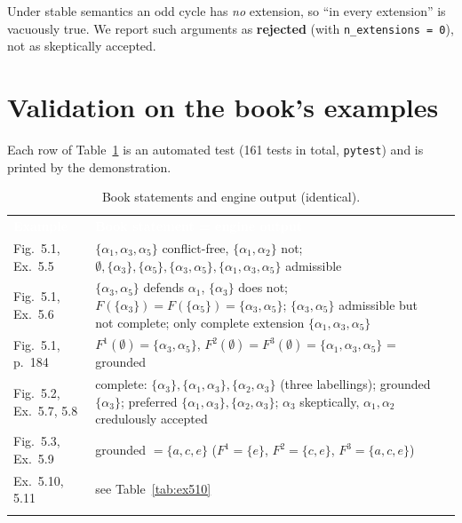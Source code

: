 \documentclass[10pt,a4paper]{article}
\newcommand{\thd}[1]{\textcolor{white}{\sffamily\bfseries #1}}
\newcommand{\yes}{\textcolor{good}{\ding{51}}}
\newcommand{\code}[1]{\textcolor{brand!85!black}{\texttt{#1}}}
\newcommand{\tabend}{\arrayrulecolor{brand}\specialrule{0.8pt}{0pt}{0pt}\arrayrulecolor{black}}
\newcommand{\al}[1]{\alpha_{#1}}
\begin{document}
\begin{notebox}
Under stable semantics an odd cycle has \emph{no} extension, so ``in every extension'' is vacuously true. We report such
arguments as \textbf{rejected} (with \code{n\_extensions = 0}), not as skeptically accepted.
\end{notebox}

\section{Validation on the book's examples}\label{sec:validation}

Each row of Table~\ref{tab:book} is an automated test (161 tests in total, \code{pytest}) and is printed by the demonstration.

\begin{table}[H]\centering
\caption{Book statements and engine output (identical).}\label{tab:book}
\small
\begin{tabularx}{\textwidth}{>{\raggedright\arraybackslash}p{2.4cm} X c}
\rowcolor{brand}\thd{Example} & \thd{Book statement = engine output} & \thd{}\\
\rowcolor{white} Fig.~5.1, Ex.~5.5 & $\{\al1,\al3,\al5\}$ conflict-free, $\{\al1,\al2\}$ not; $\emptyset,\{\al3\},\{\al5\},\{\al3,\al5\},\{\al1,\al3,\al5\}$ admissible & \yes\\
\rowcolor{rowalt} Fig.~5.1, Ex.~5.6 & $\{\al3,\al5\}$ defends $\al1$, $\{\al3\}$ does not; $F(\{\al3\})=F(\{\al5\})=\{\al3,\al5\}$; $\{\al3,\al5\}$ admissible but not complete; only complete extension $\{\al1,\al3,\al5\}$ & \yes\\
\rowcolor{white} Fig.~5.1, p.~184 & $F^1(\emptyset)=\{\al3,\al5\}$, $F^2(\emptyset)=F^3(\emptyset)=\{\al1,\al3,\al5\}$ = grounded & \yes\\
\rowcolor{rowalt} Fig.~5.2, Ex.~5.7, 5.8 & complete: $\{\al3\},\{\al1,\al3\},\{\al2,\al3\}$ (three labellings); grounded $\{\al3\}$; preferred $\{\al1,\al3\},\{\al2,\al3\}$; $\al3$ skeptically, $\al1,\al2$ credulously accepted & \yes\\
\rowcolor{white} Fig.~5.3, Ex.~5.9 & grounded $=\{a,c,e\}$ ($F^1=\{e\}$, $F^2=\{c,e\}$, $F^3=\{a,c,e\}$) & \yes\\
\rowcolor{rowalt} Ex.~5.10, 5.11 & see Table~\ref{tab:ex510} & \yes\\
\tabend
\end{tabularx}
\end{table}
\end{document}
